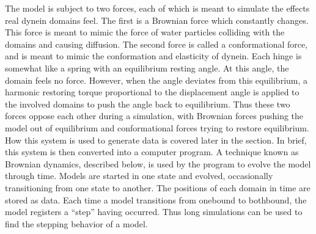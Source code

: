 \documentclass[
11pt, %
english, %
singlespacing, %
headsepline, %
chapterinoneline, %
]{MastersDoctoralThesis} %
\begin{document}
The model is subject to two forces, each of which is meant to simulate the effects real dynein domains feel. The first is a Brownian force which constantly changes. This force is meant to mimic the force of water particles colliding with the domains and causing diffusion. The second force is called a conformational force, and is meant to mimic the conformation and elasticity of dynein. Each hinge is somewhat like a spring with an equilibrium resting angle. At this angle, the domain feels no force. However, when the angle deviates from this equilibrium, a harmonic restoring torque proportional to the displacement angle is applied to the involved domains to push the angle back to equilibrium. Thus these two forces oppose each other during a simulation, with Brownian forces pushing the model out of equilibrium and conformational forces trying to restore equilibrium.\\

How this system is used to generate data is covered later in the section. In brief, this system is then converted into a computer program. A technique known as Brownian dynamics, described below, is used by the program to evolve the model through time. Models are started in one state and evolved, occasionally transitioning from one state to another. The positions of each domain in time are stored as data. Each time a model transitions from onebound to bothbound, the model registers a ``step'' having occurred. Thus long simulations can be used to find the stepping behavior of a model.\\


\end{document}
